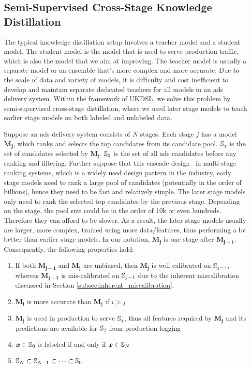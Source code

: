 \subsection{Semi-Supervised Cross-Stage Knowledge Distillation}
\label{subsec:semi_consistency_calib}

The typical knowledge distillation setup involves a teacher model and a student model. The student model is the model that is used to serve production traffic, which is also the model that we aim at improving. The teacher model is usually a separate model or an ensemble that's more complex and more accurate. Due to the scale of data and variety of models, it is difficulty and cost inefficient to develop and maintain separate dedicated teachers for all models in an ads delivery system. Within the framework of UKDSL, we solve this problem by semi-supervised cross-stage distillation, where we used later stage models to teach earlier stage models on both labeled and unlabeled data.

Suppose an ads delivery system consists of $N$ stages. Each stage $j$ has a model $\mathbf{M_j}$, which ranks and selects the top candidates from its candidate pool. ${\mathbb{S}}_j$ is the set of candidates selected by $\mathbf{M_j}$. ${\mathbb{S}}_0$ is the set of all ads candidates before any ranking and filtering. 
Further suppose that this cascade design~\cite{wang2023towards} in multi-stage ranking systems, which is a widely used design pattern in the industry, early stage models need to rank a large pool of candidates (potentially in the order of billions), hence they need to be fast and relatively simple. 
The later stage models only need to rank the selected top candidates by the previous stage. Depending on the stage, the pool size could be in the order of 10k or even hundreds. Therefore they can afford to be slower. As a result, the later stage models usually are larger, more complex, trained using more data/features, thus performing a lot better than earlier stage models. In our notation,  $\mathbf{M_j}$ is one stage after  $\mathbf{M_{j-1}}$.
Consequently, the following properties hold:

\begin{enumerate}
    \item \label{cali-property} If both $\mathbf{M_{j-1}}$ and $\mathbf{M_j}$ are unbiased, then $\mathbf{M_j}$ is well calibrated on ${\mathbb{S}}_{j-1}$, whereas $\mathbf{M_{j-1}}$ is mis-calibrated on ${\mathbb{S}}_{j-1}$ due to the inherent miscalibration discussed in Section \ref{subsec:inherent_miscalibration}.
    \item \label{accu-property} $\mathbf{M_i}$ is more accurate than $\mathbf{M_j}$ if $i > j$
    \item \label{data-availability-property} $\mathbf{M_j}$ is used in production to serve ${\mathbb{S}}_j$, thus all features required by $\mathbf{M_j}$ and its predictions are available for ${\mathbb{S}}_j$ from production logging
    \item \label{label-property} ${\bm{x}} \in {\mathbb{S}}_0$ is labeled if and only if ${\bm{x}} \in {\mathbb{S}}_N$
    \item \label{set-property} ${\mathbb{S}}_N \subset {\mathbb{S}}_{N-1} \subset \dots \subset {\mathbb{S}}_0$
\end{enumerate}

